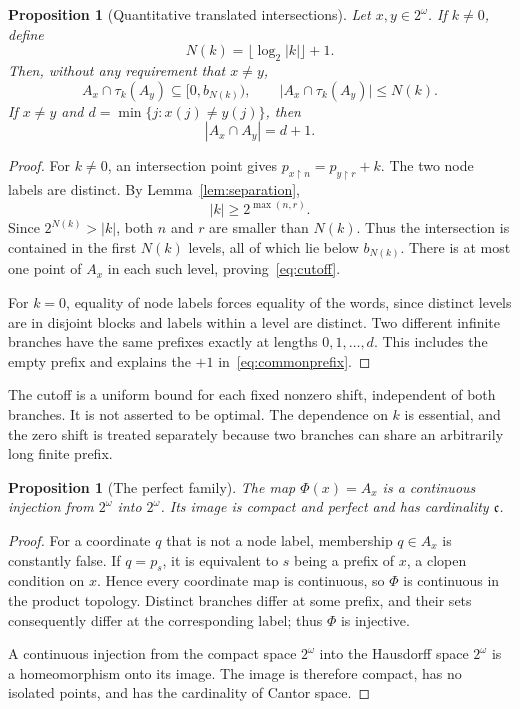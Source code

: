 \documentclass[11pt,a4paper]{article}
\newtheorem{proposition}[theorem]{Proposition}
\theoremstyle{definition}
\theoremstyle{remark}
\newcommand{\cfr}{\mathfrak c}
\newcommand{\sh}[2]{\tau_{#1}(#2)}
\newcommand{\restr}{\mathbin{\upharpoonright}}
\begin{document}
\begin{proposition}[Quantitative translated intersections]
\label{prop:quantitative}
Let $x,y\in2^\omega$.
If $k\ne0$, define
\[
                   N(k)=\lfloor\log_2|k|\rfloor+1.
\]
Then, without any requirement that $x\ne y$,
\begin{equation}
\label{eq:cutoff}
 A_x\cap\sh{k}{A_y}\subseteq[0,b_{N(k)}),
 \qquad
 \bigl|A_x\cap\sh{k}{A_y}\bigr|\le N(k).
\end{equation}
If $x\ne y$ and $d=\min\{j:x(j)\ne y(j)\}$, then
\begin{equation}
\label{eq:commonprefix}
                  |A_x\cap A_y|=d+1.
\end{equation}
\end{proposition}
\begin{proof}
For $k\ne0$, an intersection point gives
$p_{x\restr n}=p_{y\restr r}+k$. The two node labels are distinct.
By Lemma~\ref{lem:separation},
\[
                           |k|\ge2^{\max(n,r)}.
\]
Since $2^{N(k)}>|k|$, both $n$ and $r$ are smaller than $N(k)$. Thus the
intersection is contained in the first $N(k)$ levels, all of which lie
below $b_{N(k)}$. There is at most one point of $A_x$ in each such level,
proving~\eqref{eq:cutoff}.

For $k=0$, equality of node labels forces equality of the words, since
distinct levels are in disjoint blocks and labels within a level are
distinct. Two different infinite branches have the same prefixes
exactly at lengths $0,1,\ldots,d$. This includes the empty prefix and
explains the $+1$ in~\eqref{eq:commonprefix}.
\end{proof}

The cutoff is a uniform bound for each fixed nonzero shift, independent
of both branches. It is not asserted to be optimal. The dependence on
$k$ is essential, and the zero shift is treated separately because two
branches can share an arbitrarily long finite prefix.

\begin{proposition}[The perfect family]
\label{prop:perfect}
The map $\Phi(x)=A_x$ is a continuous injection from $2^\omega$ into
$2^\omega$. Its image is compact and perfect and has cardinality
$\cfr$.
\end{proposition}
\begin{proof}
For a coordinate $q$ that is not a node label, membership
$q\in A_x$ is constantly false. If $q=p_s$, it is equivalent to $s$
being a prefix of $x$, a clopen condition on $x$. Hence every coordinate
map is continuous, so $\Phi$ is continuous in the product topology.
Distinct branches differ at some prefix, and their sets consequently
differ at the corresponding label; thus $\Phi$ is injective.

A continuous injection from the compact space $2^\omega$ into the
Hausdorff space $2^\omega$ is a homeomorphism onto its image. The image
is therefore compact, has no isolated points, and has the cardinality
of Cantor space.
\end{proof}
\end{document}
